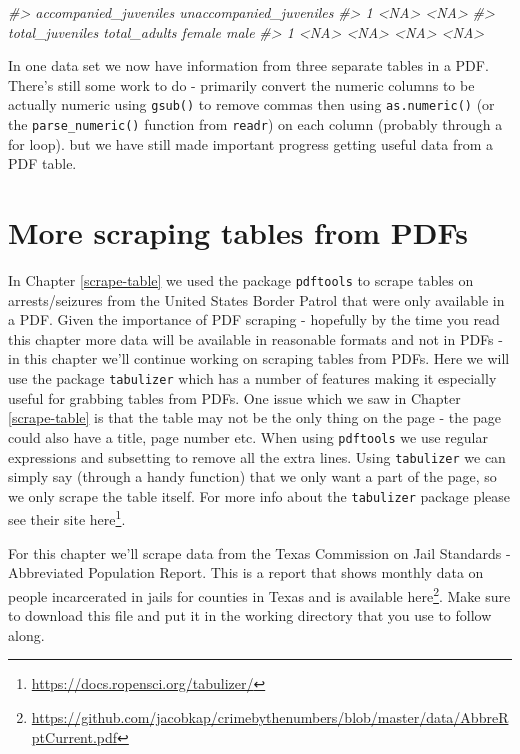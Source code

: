 \documentclass[
]{krantz}
\makeatletter
\newenvironment{Shaded}{\begin{snugshade}}{\end{snugshade}}
\newcommand{\CommentTok}[1]{\textcolor[rgb]{0.37,0.37,0.37}{\textit{#1}}}
\renewcommand{\href}[2]{#2\footnote{\url{#1}}}
\newenvironment{kframe}{%
\medskip{}
\setlength{\fboxsep}{.8em}
 \def\at@end@of@kframe{}%
 \ifinner\ifhmode%
  \def\at@end@of@kframe{\end{minipage}}%
  \begin{minipage}{\columnwidth}%
 \fi\fi%
 \def\FrameCommand##1{\hskip\@totalleftmargin \hskip-\fboxsep
 \colorbox{shadecolor}{##1}\hskip-\fboxsep
     \hskip-\linewidth \hskip-\@totalleftmargin \hskip\columnwidth}%
 \MakeFramed {\advance\hsize-\width
   \@totalleftmargin\z@ \linewidth\hsize
   \@setminipage}}%
 {\par\unskip\endMakeFramed%
 \at@end@of@kframe}
\renewenvironment{Shaded}{\begin{kframe}}{\end{kframe}}
\makeatother
\begin{document}
\begin{Shaded}
\begin{Highlighting}[]
\CommentTok{\#\textgreater{}   accompanied\_juveniles unaccompanied\_juveniles}
\CommentTok{\#\textgreater{} 1                  \textless{}NA\textgreater{}                    \textless{}NA\textgreater{}}
\CommentTok{\#\textgreater{}   total\_juveniles total\_adults female male}
\CommentTok{\#\textgreater{} 1            \textless{}NA\textgreater{}         \textless{}NA\textgreater{}   \textless{}NA\textgreater{} \textless{}NA\textgreater{}}
\end{Highlighting}
\end{Shaded}

In one data set we now have information from three separate tables in a PDF. There's still some work to do - primarily convert the numeric columns to be actually numeric using \texttt{gsub()} to remove commas then using \texttt{as.numeric()} (or the \texttt{parse\_numeric()} function from \texttt{readr}) on each column (probably through a for loop). but we have still made important progress getting useful data from a PDF table.

\hypertarget{scrape-table2}{%
\chapter{More scraping tables from PDFs}\label{scrape-table2}}

In Chapter \ref{scrape-table} we used the package \texttt{pdftools} to scrape tables on arrests/seizures from the United States Border Patrol that were only available in a PDF. Given the importance of PDF scraping - hopefully by the time you read this chapter more data will be available in reasonable formats and not in PDFs - in this chapter we'll continue working on scraping tables from PDFs. Here we will use the package \texttt{tabulizer} which has a number of features making it especially useful for grabbing tables from PDFs. One issue which we saw in Chapter \ref{scrape-table} is that the table may not be the only thing on the page - the page could also have a title, page number etc. When using \texttt{pdftools} we use regular expressions and subsetting to remove all the extra lines. Using \texttt{tabulizer} we can simply say (through a handy function) that we only want a part of the page, so we only scrape the table itself. For more info about the \texttt{tabulizer} package please see their site \href{https://docs.ropensci.org/tabulizer/}{here}.

For this chapter we'll scrape data from the Texas Commission on Jail Standards - Abbreviated Population Report. This is a report that shows monthly data on people incarcerated in jails for counties in Texas and is available \href{https://github.com/jacobkap/crimebythenumbers/blob/master/data/AbbreRptCurrent.pdf}{here}. Make sure to download this file and put it in the working directory that you use to follow along.
\end{document}

